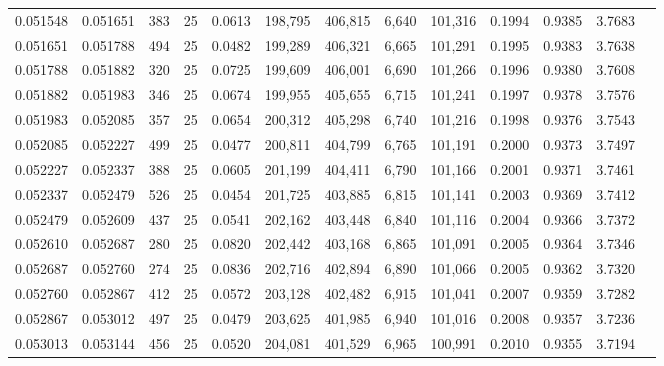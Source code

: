 \begin{tabular}{rrrrrrrrrrrrr}
0.051548 & 0.051651 &   383 &  25 &                                     0.0613 & 198,795 & 406,815 &   6,640 & 101,316 & 0.1994 & 0.9385 & 3.7683 \\
0.051651 & 0.051788 &   494 &  25 &                                     0.0482 & 199,289 & 406,321 &   6,665 & 101,291 & 0.1995 & 0.9383 & 3.7638 \\
0.051788 & 0.051882 &   320 &  25 &                                     0.0725 & 199,609 & 406,001 &   6,690 & 101,266 & 0.1996 & 0.9380 & 3.7608 \\
0.051882 & 0.051983 &   346 &  25 &                                     0.0674 & 199,955 & 405,655 &   6,715 & 101,241 & 0.1997 & 0.9378 & 3.7576 \\
0.051983 & 0.052085 &   357 &  25 &                                     0.0654 & 200,312 & 405,298 &   6,740 & 101,216 & 0.1998 & 0.9376 & 3.7543 \\
0.052085 & 0.052227 &   499 &  25 &                                     0.0477 & 200,811 & 404,799 &   6,765 & 101,191 & 0.2000 & 0.9373 & 3.7497 \\
0.052227 & 0.052337 &   388 &  25 &                                     0.0605 & 201,199 & 404,411 &   6,790 & 101,166 & 0.2001 & 0.9371 & 3.7461 \\
0.052337 & 0.052479 &   526 &  25 &                                     0.0454 & 201,725 & 403,885 &   6,815 & 101,141 & 0.2003 & 0.9369 & 3.7412 \\
0.052479 & 0.052609 &   437 &  25 &                                     0.0541 & 202,162 & 403,448 &   6,840 & 101,116 & 0.2004 & 0.9366 & 3.7372 \\
0.052610 & 0.052687 &   280 &  25 &                                     0.0820 & 202,442 & 403,168 &   6,865 & 101,091 & 0.2005 & 0.9364 & 3.7346 \\
0.052687 & 0.052760 &   274 &  25 &                                     0.0836 & 202,716 & 402,894 &   6,890 & 101,066 & 0.2005 & 0.9362 & 3.7320 \\
0.052760 & 0.052867 &   412 &  25 &                                     0.0572 & 203,128 & 402,482 &   6,915 & 101,041 & 0.2007 & 0.9359 & 3.7282 \\
0.052867 & 0.053012 &   497 &  25 &                                     0.0479 & 203,625 & 401,985 &   6,940 & 101,016 & 0.2008 & 0.9357 & 3.7236 \\
0.053013 & 0.053144 &   456 &  25 &                                     0.0520 & 204,081 & 401,529 &   6,965 & 100,991 & 0.2010 & 0.9355 & 3.7194 \\

\end{tabular}
